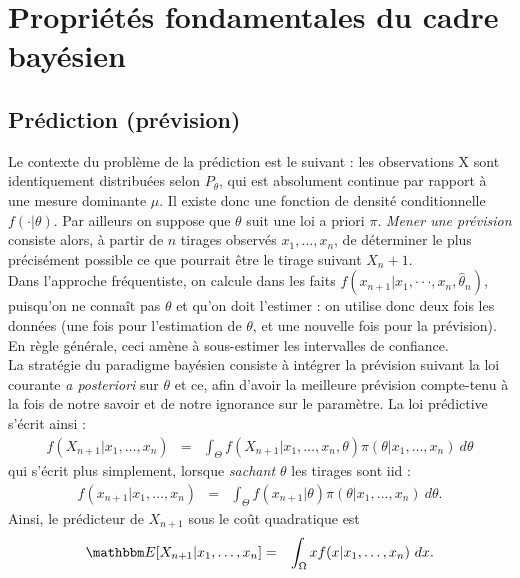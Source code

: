 \section{Propriétés fondamentales du cadre bayésien}\label{proprietes}

\subsection{Prédiction (prévision)}\label{predictivite}

Le contexte du problème de la prédiction est le suivant : les observations X sont identiquement distribuées selon $P_{\theta}$, qui est absolument continue par rapport à une mesure dominante $\mu$. Il existe donc une fonction de densité conditionnelle $f(·|\theta)$. Par ailleurs on suppose que $\theta$ suit une loi a priori $\pi$. \emph{Mener une prévision} consiste alors, 
à partir de $n$ tirages observés $x_1,\ldots,x_n$, de déterminer le plus précisément possible ce que pourrait être le tirage suivant $X_n+1$. \\

Dans l’approche fréquentiste, on calcule dans les faits $f(x_{n+1}|x_1,··· ,x_n,\hat{\theta}_n)$, puisqu'on ne connaît pas $\theta$ et qu'on doit l'estimer : on utilise donc deux fois les données (une fois pour l'estimation de $\theta$, et une nouvelle fois pour la prévision). En règle générale, ceci amène   à sous-estimer les intervalles de confiance. \\

La stratégie du paradigme bayésien consiste à intégrer la prévision suivant la loi courante {\it a posteriori} sur $\theta$ et ce, afin d’avoir la meilleure prévision compte-tenu à la fois de notre savoir et de notre ignorance sur le paramètre. La loi prédictive s’écrit ainsi :
\begin{eqnarray*}
f(X_{n+1}|x_1,\ldots,x_n) & = & \int_{\Theta} f(X_{n+1}|x_1,\ldots,x_n,\theta) \pi(\theta|x_1,\ldots,x_n) \ d\theta
\end{eqnarray*}
qui s'écrit plus simplement, lorsque \emph{sachant $\theta$} les tirages sont iid :
\begin{eqnarray*}
f(x_{n+1}|x_1,\ldots,x_n) & = & \int_{\Theta} f(x_{n+1}|\theta) \pi(\theta|x_1,\ldots,x_n) \ d\theta.
\end{eqnarray*}
Ainsi, le prédicteur de $X_{n+1}$ sous le coût quadratique est
\begin{eqnarray*}
\E[X_{n+1}|x_1,\ldots,x_n] & = & \int_{\Omega} x f(x|x_1,\ldots,x_n) \ dx. 
\end{eqnarray*}


